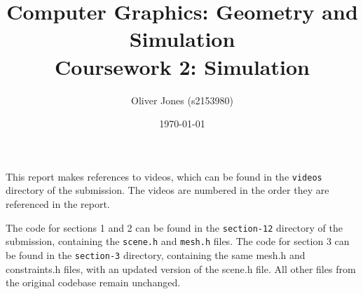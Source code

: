 \documentclass[12pt, a4paper]{article}
\title{Computer Graphics: Geometry and Simulation\\Coursework 2: Simulation}
\author{Oliver Jones (s2153980)}
\date{\today}
\begin{document}
\maketitle

This report makes references to videos, which can be found in the
    \texttt{videos} directory of the submission.
The videos are numbered in the order they are referenced in the report.

The code for sections 1 and 2 can be found in the \texttt{section-12} directory
    of the submission, containing the \texttt{scene.h} and \texttt{mesh.h} files.
The code for section 3 can be found in the \texttt{section-3} directory,
    containing the same mesh.h and constraints.h files, with an updated version of
    the scene.h file.
All other files from the original codebase remain unchanged.
\end{document}
